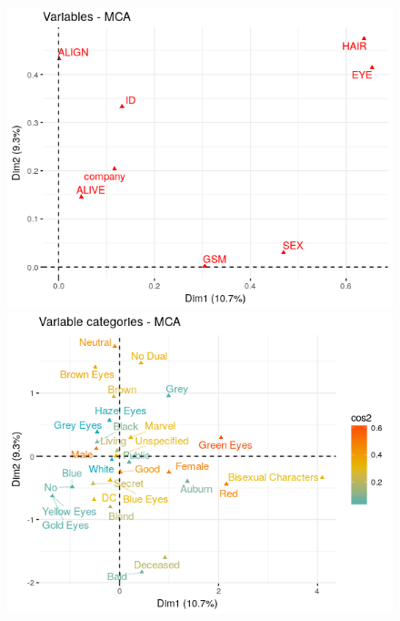 \begin{figure}[!htb]
\hspace*{-1.3cm}
    \centering
    \begin{minipage}{.55\textwidth}
        \centering
        \includegraphics[width=\linewidth]{img/MCA_vars.png}
    \end{minipage}%
     \begin{minipage}{.05\textwidth}
      \hfill
    \end{minipage}%
    \begin{minipage}{0.55\textwidth}
    \centering
        \includegraphics[width=\linewidth]{img/MCA_vars_cat_q.png}
    \end{minipage}
\end{figure}

